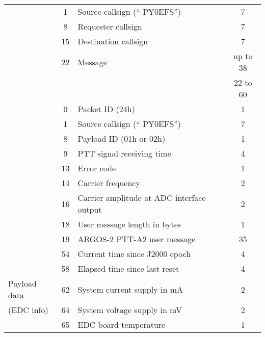 \begin{longtable}[c]{lcL{0.4\textwidth}c}
                                            & 1  & Source callsign (`` PY0EFS'')        & 7 \\
                                            & 8  & Requester callsign                   & 7 \\
                                            & 15 & Destination callsign                 & 7 \\
                                            & 22 & Message                              & up to 38 \\
                                            &    &                                      & 22 to 60 \\
                                            & 0  & Packet ID (24h)                      & 1 \\
                                            & 1  & Source callsign (`` PY0EFS'')        & 7 \\
                                            & 8  & Payload ID (01h or 02h)              & 1 \\
                                            & 9  & PTT signal receiving time            & 4 \\
                                            & 13 & Error code                           & 1 \\
                                            & 14 & Carrier frequency                    & 2 \\
                                            & 16 & Carrier amplitude at ADC interface output & 2 \\
                                            & 18 & User message length in bytes         & 1 \\
                                            & 19 & ARGOS-2 PTT-A2 user message          & 35 \\
                                            & 54 & Current time since J2000 epoch       & 4 \\
                                            & 58 & Elapsed time since last reset        & 4 \\
   Payload data                             & 62 & System current supply in mA          & 2 \\
   (EDC info)                               & 64 & System voltage supply in mV          & 2 \\
                                            & 65 & EDC board temperature                & 1 \\

\end{longtable}
